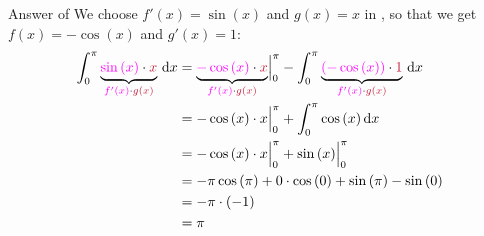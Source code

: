 \documentclass[10pt, aspectratio=1610]{beamer}
\begin{document}
\begin{frame}{Answer of }\vspace{4pt}\label{slide:7}
  We choose $f'(x)=\sin{(x)}$ and $g(x)=x$ in , 
  so that we get $f(x)=-\cos{(x)}$ and $g'(x)=1$:
  \begin{align*}
    \int_0^{\pi} \underbrace{\textcolor[rgb]{1,0,1}{\sin{(x)}} \cdot \textcolor[rgb]{0.77,0.12,0.23}{x}}_{\textcolor[rgb]{1,0,1}{f'(x)}\cdot \textcolor[rgb]{0.77,0.12,0.23}{g(x)}}\,\mathrm{d}x 
    &= \Bigl. \underbrace{\textcolor[rgb]{1,0,1}{-\cos{(x)}} \cdot \textcolor[rgb]{0.77,0.12,0.23}{x}}_{\textcolor[rgb]{1,0,1}{f'(x)}\cdot \textcolor[rgb]{0.77,0.12,0.23}{g(x)}}\Bigr|_0^{\pi} 
    - \int_0^{\pi} \underbrace{\textcolor[rgb]{1,0,1}{(-\cos{(x)})}\cdot \textcolor[rgb]{0.77,0.12,0.23}{1}}_{\textcolor[rgb]{1,0,1}{f'(x)}\cdot \textcolor[rgb]{0.77,0.12,0.23}{g(x)}}\,\mathrm{d}x\\
    &= \Bigl. -\cos{(x)}\cdot x\Bigr|_{0}^{\pi} + \int_0^{\pi} \cos{(x)}\,\mathrm{d}x\\
    &= \Bigl. -\cos{(x)}\cdot x\Bigr|_{0}^{\pi} + \Bigl. \sin{(x)}\Bigr|_{0}^{\pi}\\
    &= -\pi \cos{(\pi)} + 0 \cdot \cos{(0)} + \sin{(\pi)} - \sin{(0)}\\
    &= -\pi \cdot (-1)\\
    &= \pi
  \end{align*}
  \vspace{4pt}
  \hyperlink{qe:2}{}
\end{frame}
\end{document}

